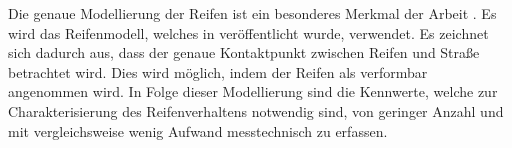 Die genaue Modellierung der Reifen ist ein besonderes Merkmal der Arbeit \cite{Cossalter2002}. Es wird das Reifenmodell, welches in \cite{Lot2004} ver\"offentlicht wurde, verwendet. Es zeichnet sich dadurch aus, dass der genaue Kontaktpunkt zwischen Reifen und Stra\ss{}e betrachtet wird. Dies wird m\"oglich, indem der Reifen als verformbar angenommen wird. In Folge dieser Modellierung sind die Kennwerte, welche zur Charakterisierung des Reifenverhaltens notwendig sind, von geringer Anzahl und mit vergleichsweise wenig Aufwand messtechnisch zu erfassen.   